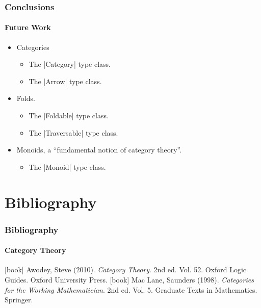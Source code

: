 \documentclass{beamer}
\begin{document}
\begin{frame}[fragile]
  \frametitle{Conclusions}
  \framesubtitle{Future Work}

  \begin{itemize}
  \item
    Categories
    \begin{itemize}
    \item
      The |Category| type class.
    \item
      The |Arrow| type class.
    \end{itemize}
  \end{itemize}
  \begin{itemize}
  \item
    Folds.
    \begin{itemize}
    \item
      The |Foldable| type class.
    \item
      The |Traversable| type class.
    \end{itemize}
  \end{itemize}
  \begin{itemize}
  \item
    Monoids, a ``fundamental notion of category theory''.
    \begin{itemize}
    \item
      The |Monoid| type class.
    \end{itemize}
  \end{itemize}

\end{frame}


\section*{Bibliography}


\begin{frame}
  \frametitle{Bibliography}
  \framesubtitle{Category Theory}

  \begin{thebibliography}{Mac Lane 1998}
  [book]
    Awodey, Steve (2010).
    \newblock \emph{Category Theory}.
    \newblock 2nd ed. Vol. 52. Oxford Logic Guides.
    \newblock Oxford University Press.
  [book]
    Mac Lane, Saunders (1998).
    \newblock \emph{Categories for the Working Mathematician}.
    \newblock 2nd ed. Vol. 5. Graduate Texts in Mathematics.
    \newblock Springer.
  \end{thebibliography}

\end{frame}
\end{document}
